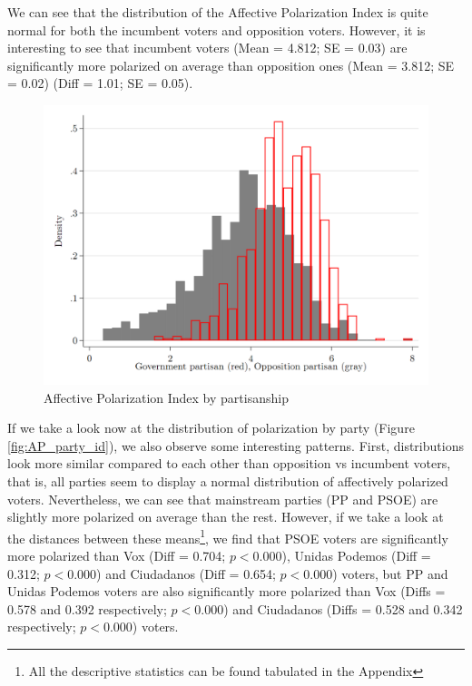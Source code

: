 \documentclass[a4paper, svgnames]{article}
\begin{document}
We can see that the distribution of the Affective Polarization Index is quite normal for both the incumbent voters and opposition voters. However, it is interesting to see that incumbent voters (Mean = 4.812; SE = 0.03) are significantly more polarized on average than opposition ones (Mean = 3.812; SE = 0.02) (Diff = 1.01; SE = 0.05).

\begin{figure}[H]
	\centering
	\includegraphics[scale=0.25]{Figures/AP_index_by_partisanship.png}
	\caption{\label{fig:AP_partisan} Affective Polarization Index by partisanship}
\end{figure}

If we take a look now at the distribution of polarization by party (Figure \ref*{fig:AP_party_id}), we also observe some interesting patterns. First, distributions look more similar compared to each other than opposition vs incumbent voters, that is, all parties seem to display a normal distribution of affectively polarized voters. Nevertheless, we can see that mainstream parties (PP and PSOE) are slightly more polarized on average than the rest. However, if we take a look at the distances between these means\footnote{All the descriptive statistics can be found tabulated in the Appendix}, we find that PSOE voters are significantly more polarized than Vox (Diff = 0.704; $p < 0.000$), Unidas Podemos (Diff = 0.312; $p < 0.000$) and Ciudadanos (Diff = 0.654; $p < 0.000$) voters, but PP and Unidas Podemos voters are also significantly more polarized than Vox (Diffs = 0.578 and 0.392 respectively; $p<0.000$) and Ciudadanos (Diffs = 0.528 and 0.342 respectively; $p<0.000$) voters.
\end{document}
